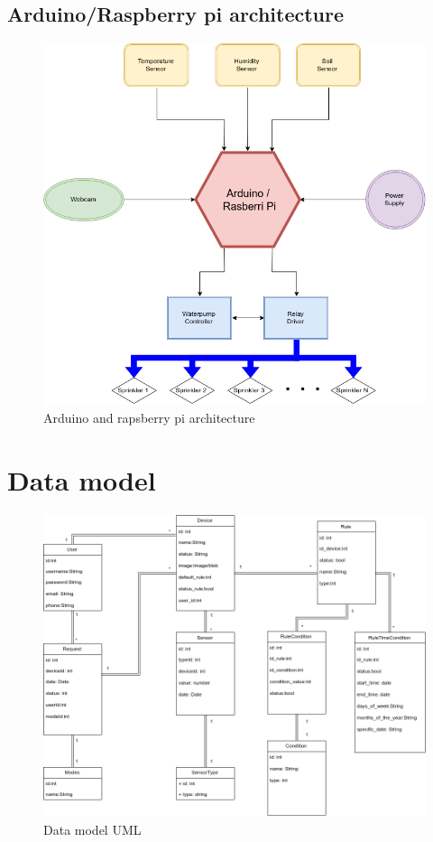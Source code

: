 \documentclass[11pt,a4paper]{article}
\begin{document}
\subsection{Arduino/Raspberry pi architecture}
\begin{figure}[hbtp]
\centering
\includegraphics[scale=0.6]{figures/ArduinoArch.png}
\caption{Arduino and rapsberry pi architecture}
\end{figure}

\newpage

\section{Data model}
\begin{figure}[hbtp]
\centering
\includegraphics[scale=0.5]{figures/ModelDeDades.png}
\caption{Data model UML}
\end{figure}
\end{document}
